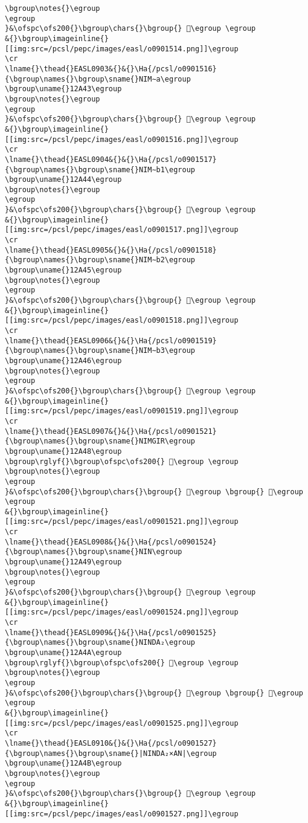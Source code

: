 \begin{verbatim}
\bgroup\notes{}\egroup
\egroup
}&\ofspc\ofs200{}\bgroup\chars{}\bgroup{} 𒩂\egroup \egroup
&{}\bgroup\imageinline{}[[img:src=/pcsl/pepc/images/easl/o0901514.png]]\egroup
\cr
\lname{}\thead{}EASL0903&{}&{}\Ha{/pcsl/o0901516}{\bgroup\names{}\bgroup\sname{}NIM∼a\egroup
\bgroup\uname{}12A43\egroup
\bgroup\notes{}\egroup
\egroup
}&\ofspc\ofs200{}\bgroup\chars{}\bgroup{} 𒩃\egroup \egroup
&{}\bgroup\imageinline{}[[img:src=/pcsl/pepc/images/easl/o0901516.png]]\egroup
\cr
\lname{}\thead{}EASL0904&{}&{}\Ha{/pcsl/o0901517}{\bgroup\names{}\bgroup\sname{}NIM∼b1\egroup
\bgroup\uname{}12A44\egroup
\bgroup\notes{}\egroup
\egroup
}&\ofspc\ofs200{}\bgroup\chars{}\bgroup{} 𒩄\egroup \egroup
&{}\bgroup\imageinline{}[[img:src=/pcsl/pepc/images/easl/o0901517.png]]\egroup
\cr
\lname{}\thead{}EASL0905&{}&{}\Ha{/pcsl/o0901518}{\bgroup\names{}\bgroup\sname{}NIM∼b2\egroup
\bgroup\uname{}12A45\egroup
\bgroup\notes{}\egroup
\egroup
}&\ofspc\ofs200{}\bgroup\chars{}\bgroup{} 𒩅\egroup \egroup
&{}\bgroup\imageinline{}[[img:src=/pcsl/pepc/images/easl/o0901518.png]]\egroup
\cr
\lname{}\thead{}EASL0906&{}&{}\Ha{/pcsl/o0901519}{\bgroup\names{}\bgroup\sname{}NIM∼b3\egroup
\bgroup\uname{}12A46\egroup
\bgroup\notes{}\egroup
\egroup
}&\ofspc\ofs200{}\bgroup\chars{}\bgroup{} 𒩆\egroup \egroup
&{}\bgroup\imageinline{}[[img:src=/pcsl/pepc/images/easl/o0901519.png]]\egroup
\cr
\lname{}\thead{}EASL0907&{}&{}\Ha{/pcsl/o0901521}{\bgroup\names{}\bgroup\sname{}NIMGIR\egroup
\bgroup\uname{}12A48\egroup
\bgroup\rglyf{}\bgroup\ofspc\ofs200{} 𒩈\egroup \egroup
\bgroup\notes{}\egroup
\egroup
}&\ofspc\ofs200{}\bgroup\chars{}\bgroup{} 𒩇\egroup \bgroup{} 𒩈\egroup \egroup
&{}\bgroup\imageinline{}[[img:src=/pcsl/pepc/images/easl/o0901521.png]]\egroup
\cr
\lname{}\thead{}EASL0908&{}&{}\Ha{/pcsl/o0901524}{\bgroup\names{}\bgroup\sname{}NIN\egroup
\bgroup\uname{}12A49\egroup
\bgroup\notes{}\egroup
\egroup
}&\ofspc\ofs200{}\bgroup\chars{}\bgroup{} 𒩉\egroup \egroup
&{}\bgroup\imageinline{}[[img:src=/pcsl/pepc/images/easl/o0901524.png]]\egroup
\cr
\lname{}\thead{}EASL0909&{}&{}\Ha{/pcsl/o0901525}{\bgroup\names{}\bgroup\sname{}NINDA₂\egroup
\bgroup\uname{}12A4A\egroup
\bgroup\rglyf{}\bgroup\ofspc\ofs200{} 𒩊\egroup \egroup
\bgroup\notes{}\egroup
\egroup
}&\ofspc\ofs200{}\bgroup\chars{}\bgroup{} 𒩧\egroup \bgroup{} 𒩊\egroup \egroup
&{}\bgroup\imageinline{}[[img:src=/pcsl/pepc/images/easl/o0901525.png]]\egroup
\cr
\lname{}\thead{}EASL0910&{}&{}\Ha{/pcsl/o0901527}{\bgroup\names{}\bgroup\sname{}|NINDA₂×AN|\egroup
\bgroup\uname{}12A4B\egroup
\bgroup\notes{}\egroup
\egroup
}&\ofspc\ofs200{}\bgroup\chars{}\bgroup{} 𒩋\egroup \egroup
&{}\bgroup\imageinline{}[[img:src=/pcsl/pepc/images/easl/o0901527.png]]\egroup

\end{verbatim}
